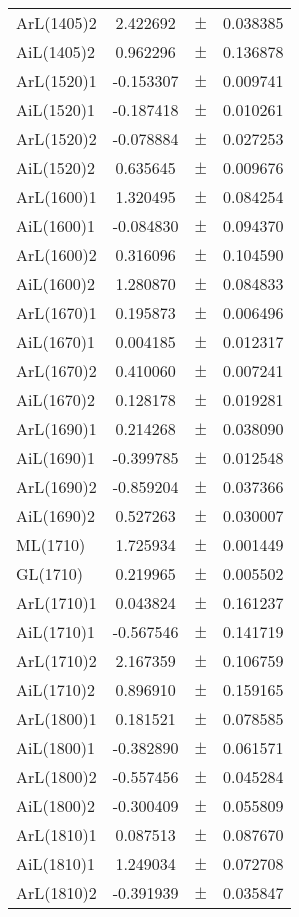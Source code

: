 \begin{table}
\begin{tiny}
\begin{tabular}{lccc}
ArL(1405)2 & 2.422692 & $\pm$ & 0.038385 \\
AiL(1405)2 & 0.962296 & $\pm$ & 0.136878 \\
ArL(1520)1 & -0.153307 & $\pm$ & 0.009741 \\
AiL(1520)1 & -0.187418 & $\pm$ & 0.010261 \\
ArL(1520)2 & -0.078884 & $\pm$ & 0.027253 \\
AiL(1520)2 & 0.635645 & $\pm$ & 0.009676 \\
ArL(1600)1 & 1.320495 & $\pm$ & 0.084254 \\
AiL(1600)1 & -0.084830 & $\pm$ & 0.094370 \\
ArL(1600)2 & 0.316096 & $\pm$ & 0.104590 \\
AiL(1600)2 & 1.280870 & $\pm$ & 0.084833 \\
ArL(1670)1 & 0.195873 & $\pm$ & 0.006496 \\
AiL(1670)1 & 0.004185 & $\pm$ & 0.012317 \\
ArL(1670)2 & 0.410060 & $\pm$ & 0.007241 \\
AiL(1670)2 & 0.128178 & $\pm$ & 0.019281 \\
ArL(1690)1 & 0.214268 & $\pm$ & 0.038090 \\
AiL(1690)1 & -0.399785 & $\pm$ & 0.012548 \\
ArL(1690)2 & -0.859204 & $\pm$ & 0.037366 \\
AiL(1690)2 & 0.527263 & $\pm$ & 0.030007 \\
ML(1710) & 1.725934 & $\pm$ & 0.001449 \\
GL(1710) & 0.219965 & $\pm$ & 0.005502 \\
ArL(1710)1 & 0.043824 & $\pm$ & 0.161237 \\
AiL(1710)1 & -0.567546 & $\pm$ & 0.141719 \\
ArL(1710)2 & 2.167359 & $\pm$ & 0.106759 \\
AiL(1710)2 & 0.896910 & $\pm$ & 0.159165 \\
ArL(1800)1 & 0.181521 & $\pm$ & 0.078585 \\
AiL(1800)1 & -0.382890 & $\pm$ & 0.061571 \\
ArL(1800)2 & -0.557456 & $\pm$ & 0.045284 \\
AiL(1800)2 & -0.300409 & $\pm$ & 0.055809 \\
ArL(1810)1 & 0.087513 & $\pm$ & 0.087670 \\
AiL(1810)1 & 1.249034 & $\pm$ & 0.072708 \\
ArL(1810)2 & -0.391939 & $\pm$ & 0.035847 \\

\end{tabular}
\end{tiny}
\end{table}
